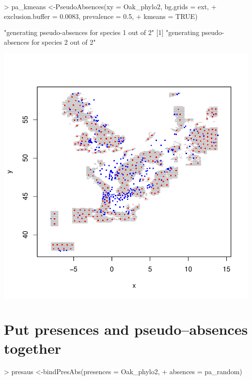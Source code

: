 \documentclass[10pt,a4paper]{report}
\begin{document}
\begin{Schunk}
\begin{Sinput}
> pa_kmeans <-PseudoAbsences(xy = Oak_phylo2, bg.grids = ext, 
+ 	exclusion.buffer = 0.0083, prevalence = 0.5, 
+   kmeans = TRUE)
\end{Sinput}
\begin{Soutput}
[1] "generating pseudo-absences for species 1 out of 2"
[1] "generating pseudo-absences for species 2 out of 2"
\end{Soutput}
\end{Schunk}
\includegraphics{mopa-mopa10}

\section{Put presences and pseudo--absences together}

\begin{Schunk}
\begin{Sinput}
> presaus <-bindPresAbs(presences = Oak_phylo2, 
+                       absences = pa_random)
\end{Sinput}
\end{Schunk}
\end{document}
